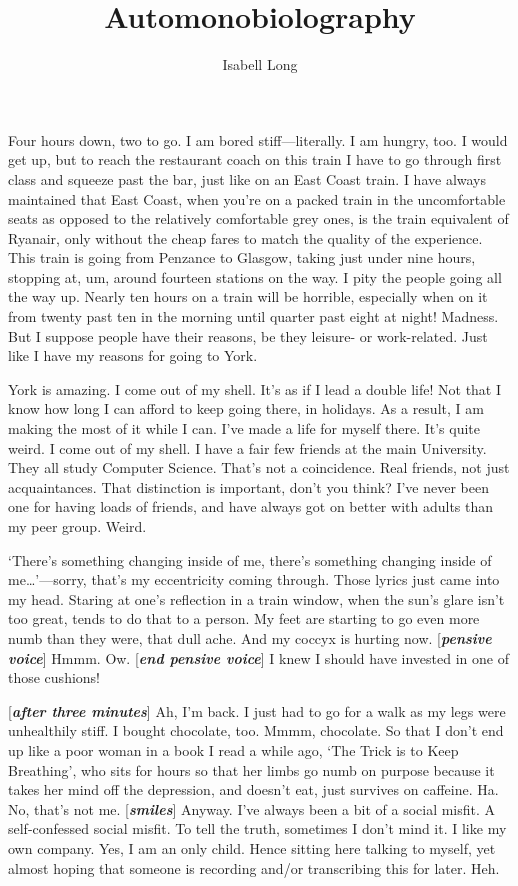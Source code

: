 \documentclass[11pt,a4paper]{article}
\begin{document}
\title{Automonobiolography}
\author{Isabell Long}
\maketitle

Four hours down, two to go.  I am bored stiff---literally.  I am hungry, too.  I would get up, but to reach the restaurant coach on this train I have to go through first class and squeeze past the bar, just like on an East Coast train.  I have always maintained that East Coast, when you're on a packed train in the uncomfortable seats as opposed to the relatively comfortable grey ones, is the train equivalent of Ryanair, only without the cheap fares to match the quality of the experience.  This train is going from Penzance to Glasgow, taking just under nine hours, stopping at, um, around fourteen stations on the way.  I pity the people going all the way up.  Nearly ten hours on a train will be horrible, especially when on it from twenty past ten in the morning until quarter past eight at night!  Madness.  But I suppose people have their reasons, be they leisure- or work-related.  Just like I have my reasons for going to York.

York is amazing.  I come out of my shell.  It's as if I lead a double life!  Not that I know how long I can afford to keep going there, in holidays.  As a result, I am making the most of it while I can.  I've made a life for myself there.  It's quite weird.  I come out of my shell.  I have a fair few friends at the main University.  They all study Computer Science.  That's not a coincidence.  Real friends, not just acquaintances.  That distinction is important, don't you think?  I've never been one for having loads of friends, and have always got on better with adults than my peer group.  Weird.

`There's something changing inside of me, there's something changing inside of me\ldots'---sorry, that's my eccentricity coming through.  Those lyrics just came into my head.  Staring at one's reflection in a train window, when the sun's glare isn't too great, tends to do that to a person.  My feet are starting to go even more numb than they were, that dull ache.  And my coccyx is hurting now.  [\textsl{\textbf{pensive voice}}] Hmmm.  Ow.  [\textsl{\textbf{end pensive voice}}]  I knew I should have invested in one of those cushions!

[\textsl{\textbf{after three minutes}}] Ah, I'm back.  I just had to go for a walk as my legs were unhealthily stiff.  I bought chocolate, too.  Mmmm, chocolate.  So that I don't end up like a poor woman in a book I read a while ago, `The Trick is to Keep Breathing', who sits for hours so that her limbs go numb on purpose because it takes her mind off the depression, and doesn't eat, just survives on caffeine.  Ha.  No, that's not me.  [\textsl{\textbf{smiles}}]  Anyway.  I've always been a bit of a social misfit.  A self-confessed social misfit.  To tell the truth, sometimes I don't mind it.  I like my own company.  Yes, I am an only child.  Hence sitting here talking to myself, yet almost hoping that someone is recording and/or transcribing this for later.  Heh.
\end{document}
